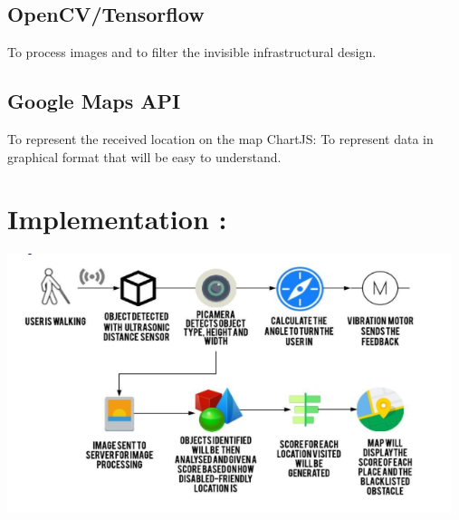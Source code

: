 \subsection
{OpenCV/Tensorflow} To process images and to filter the invisible infrastructural design.

\subsection
{Google Maps API} To represent the received location on the map
ChartJS: To represent data in graphical format that will be easy to understand.



\section{Implementation :}
\includegraphics[width=13cm]{implementation}

